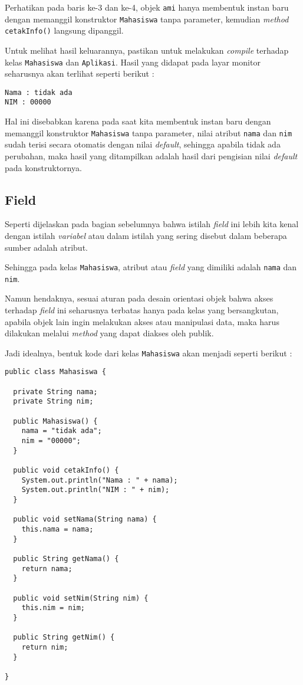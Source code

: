 Perhatikan pada baris ke-3 dan ke-4, objek \texttt{ami} hanya membentuk instan baru dengan memanggil konstruktor \texttt{Mahasiswa} tanpa parameter, kemudian \textit{method} \texttt{cetakInfo()} langsung dipanggil. 

Untuk melihat hasil keluarannya, pastikan untuk melakukan \textit{compile} terhadap kelas \texttt{Mahasiswa} dan \texttt{Aplikasi}. Hasil yang didapat pada layar monitor seharusnya akan terlihat seperti berikut :

\begin{lstlisting}
Nama : tidak ada
NIM : 00000
\end{lstlisting}

Hal ini disebabkan karena pada saat kita membentuk instan baru dengan memanggil konstruktor \texttt{Mahasiswa} tanpa parameter, nilai atribut \texttt{nama} dan \texttt{nim} sudah terisi secara otomatis dengan nilai \textit{default}, sehingga apabila tidak ada perubahan, maka hasil yang ditampilkan adalah hasil dari pengisian nilai \textit{default} pada konstruktornya.

\subsection{Field}

Seperti dijelaskan pada bagian sebelumnya bahwa istilah \textit{field} ini lebih kita kenal dengan istilah \textit{variabel} atau dalam istilah yang sering disebut dalam beberapa sumber adalah atribut.

Sehingga pada kelas \texttt{Mahasiswa}, atribut atau \textit{field} yang dimiliki adalah \texttt{nama} dan \texttt{nim}.

Namun hendaknya, sesuai aturan pada desain orientasi objek bahwa akses terhadap \textit{field} ini seharusnya terbatas hanya pada kelas yang bersangkutan, apabila objek lain ingin melakukan akses atau manipulasi data, maka harus dilakukan melalui \textit{method} yang dapat diakses oleh publik.

Jadi idealnya, bentuk kode dari kelas \texttt{Mahasiswa} akan menjadi seperti berikut :

\begin{lstlisting}
public class Mahasiswa {

  private String nama;
  private String nim;
  
  public Mahasiswa() {
    nama = "tidak ada";
    nim = "00000";
  }
  
  public void cetakInfo() {
    System.out.println("Nama : " + nama);
    System.out.println("NIM : " + nim);
  }
  
  public void setNama(String nama) {
    this.nama = nama;
  }
  
  public String getNama() {
    return nama;
  }
  
  public void setNim(String nim) {
    this.nim = nim;
  }
  
  public String getNim() {
    return nim;
  }

}
\end{lstlisting}

